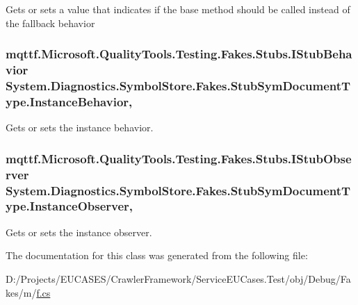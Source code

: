 Gets or sets a value that indicates if the base method should be called instead of the fallback behavior

\hypertarget{class_system_1_1_diagnostics_1_1_symbol_store_1_1_fakes_1_1_stub_sym_document_type_a90a40ee39138ead3b23c841a648e2a9b}{
\subsubsection[{Instance\-Behavior}]{\setlength{\rightskip}{0pt plus 5cm}mqttf.\-Microsoft.\-Quality\-Tools.\-Testing.\-Fakes.\-Stubs.\-I\-Stub\-Behavior System.\-Diagnostics.\-Symbol\-Store.\-Fakes.\-Stub\-Sym\-Document\-Type.\-Instance\-Behavior\hspace{0.3cm}{\ttfamily [get]}, {\ttfamily [set]}}}\label{class_system_1_1_diagnostics_1_1_symbol_store_1_1_fakes_1_1_stub_sym_document_type_a90a40ee39138ead3b23c841a648e2a9b}


Gets or sets the instance behavior.

\hypertarget{class_system_1_1_diagnostics_1_1_symbol_store_1_1_fakes_1_1_stub_sym_document_type_ad0a188d1a03dd17388a23fc989801482}{
\subsubsection[{Instance\-Observer}]{\setlength{\rightskip}{0pt plus 5cm}mqttf.\-Microsoft.\-Quality\-Tools.\-Testing.\-Fakes.\-Stubs.\-I\-Stub\-Observer System.\-Diagnostics.\-Symbol\-Store.\-Fakes.\-Stub\-Sym\-Document\-Type.\-Instance\-Observer\hspace{0.3cm}{\ttfamily [get]}, {\ttfamily [set]}}}\label{class_system_1_1_diagnostics_1_1_symbol_store_1_1_fakes_1_1_stub_sym_document_type_ad0a188d1a03dd17388a23fc989801482}


Gets or sets the instance observer.



The documentation for this class was generated from the following file\-:\begin{DoxyCompactItemize}
\item 
D\-:/\-Projects/\-E\-U\-C\-A\-S\-E\-S/\-Crawler\-Framework/\-Service\-E\-U\-Cases.\-Test/obj/\-Debug/\-Fakes/m/\hyperlink{m_2f_8cs}{f.\-cs}\end{DoxyCompactItemize}
